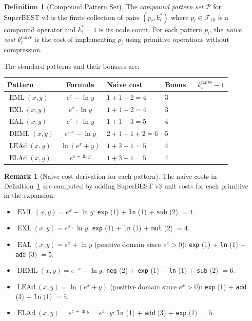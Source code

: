 \documentclass[12pt,a4paper]{article}
\theoremstyle{definition}
\newtheorem{definition}[theorem]{Definition}
\newtheorem{remark}[theorem]{Remark}
\newcommand{\EML}{\operatorname{EML}}
\newcommand{\EXL}{\operatorname{EXL}}
\newcommand{\EAL}{\operatorname{EAL}}
\newcommand{\DEML}{\operatorname{DEML}}
\newcommand{\ELAd}{\operatorname{ELAd}}
\newcommand{\LEAd}{\operatorname{LEAd}}
\begin{document}
\begin{definition}[Compound Pattern Set]
\label{def:patterns}
The \emph{compound pattern set} $\mathcal{P}$ for SuperBEST v3 is the finite
collection of pairs $(p_i, k_i^*)$ where $p_i \in \mathcal{F}_{16}$ is a
compound operator and $k_i^* = 1$ is its node count.  For each pattern $p_i$,
the \emph{na\"{i}ve cost} $k_i^{\mathrm{naive}}$ is the cost of implementing
$p_i$ using primitive operations without compression.

The standard patterns and their bonuses are:
\begin{center}
\begin{tabular}{@{}lcll@{}}
\toprule
\textbf{Pattern} & \textbf{Formula} & \textbf{Naive cost} &
  \textbf{Bonus} $= k_i^{\mathrm{naive}} - 1$ \\
\midrule
$\EML(x,y)$   & $e^x - \ln y$      & $1+1+2 = 4$   & 3 \\
$\EXL(x,y)$   & $e^x \cdot \ln y$  & $1+1+2 = 4$   & 3 \\
$\EAL(x,y)$   & $e^x + \ln y$      & $1+1+3 = 5$   & 4 \\
$\DEML(x,y)$  & $e^{-x} - \ln y$   & $2+1+1+2 = 6$ & 5 \\
$\LEAd(x,y)$  & $\ln(e^x + y)$     & $1+3+1 = 5$   & 4 \\
$\ELAd(x,y)$  & $e^{x + \ln y}$    & $1+3+1 = 5$   & 4 \\
\bottomrule
\end{tabular}
\end{center}
\end{definition}

\begin{remark}[Naive cost derivation for each pattern]
\label{rem:naive-derivations}
The naive costs in Definition~\ref{def:patterns} are computed by adding
SuperBEST v3 unit costs for each primitive in the expansion:
\begin{itemize}
  \item $\EML(x,y) = e^x - \ln y$: \texttt{exp} (1) + \texttt{ln} (1)
        + \texttt{sub} (2) $= 4$.
  \item $\EXL(x,y) = e^x \cdot \ln y$: \texttt{exp} (1) + \texttt{ln} (1)
        + \texttt{mul} (2) $= 4$.
  \item $\EAL(x,y) = e^x + \ln y$ (positive domain since $e^x > 0$):
        \texttt{exp} (1) + \texttt{ln} (1) + \texttt{add} (3) $= 5$.
  \item $\DEML(x,y) = e^{-x} - \ln y$: \texttt{neg} (2) + \texttt{exp} (1)
        + \texttt{ln} (1) + \texttt{sub} (2) $= 6$.
  \item $\LEAd(x,y) = \ln(e^x + y)$ (positive domain since $e^x > 0$):
        \texttt{exp} (1) + \texttt{add} (3) + \texttt{ln} (1) $= 5$.
  \item $\ELAd(x,y) = e^{x + \ln y} = e^x \cdot y$: \texttt{ln} (1)
        + \texttt{add} (3) + \texttt{exp} (1) $= 5$.
\end{itemize}
\end{remark}
\end{document}
